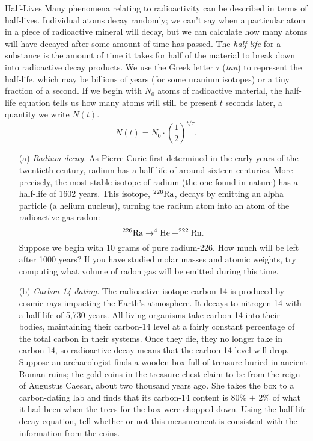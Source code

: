 \documentclass[12pt]{article}
\begin{document}
\begin{probdesc}{5}{Half-Lives}
Many phenomena relating to radioactivity can be described in terms of
half-lives.  Individual atoms decay randomly; we can't say when a
particular atom in a piece of radioactive mineral will decay, but we
can calculate how many atoms will have decayed after some amount of
time has passed.  The {\em half-life} for a substance is the amount of
time it takes for half of the material to break down into radioactive
decay products.  We use the Greek letter $\tau$ ({\em tau}) to
represent the half-life, which may be billions of years (for some
uranium isotopes) or a tiny fraction of a second.  If we begin with
$N_0$ atoms of radioactive material, the half-life equation tells us
how many atoms will still be present $t$ seconds later, a quantity we
write $N(t)$.
\begin{equation}
N(t) = N_0 \cdot \left(\frac{1}{2}\right)^{t / \tau}.
\end{equation}

\begin{enumerate}
\item[(a)] {\em Radium decay.}  As Pierre Curie first determined in
  the early years of the twentieth century, radium has a half-life of
  around sixteen centuries.  More precisely, the most stable isotope
  of radium (the one found in nature) has a half-life of 1602 years.
  This isotope, $^{226}{\rm Ra}$, decays by emitting an alpha particle (a
  helium nucleus), turning the radium atom into an atom of the
  radioactive gas radon:
  \begin{equation}
    ^{226}{\rm Ra} \rightarrow ^4{\rm He} + ^{222}{\rm Rn}.
  \end{equation}
  Suppose we begin with 10 grams of pure radium-226.  How much will be
  left after 1000 years?  If you have studied molar masses and atomic
  weights, try computing what volume of radon gas will be emitted
  during this time.

\item[(b)] {\em Carbon-14 dating.} The radioactive isotope carbon-14
  is produced by cosmic rays impacting the Earth's atmosphere.  It
  decays to nitrogen-14 with a half-life of 5,730 years.  All living
  organisms take carbon-14 into their bodies, maintaining their
  carbon-14 level at a fairly constant percentage of the total carbon
  in their systems.  Once they die, they no longer take in carbon-14,
  so radioactive decay means that the carbon-14 level will drop.
  Suppose an archaeologist finds a wooden box full of treasure buried
  in ancient Roman ruins; the gold coins in the treasure chest claim
  to be from the reign of Augustus Caesar, about two thousand years
  ago.  She takes the box to a carbon-dating lab and finds that its
  carbon-14 content is 80\% $\pm$ 2\% of what it had been when the
  trees for the box were chopped down.  Using the half-life decay
  equation, tell whether or not this measurement is consistent with
  the information from the coins.


\end{enumerate}
\end{probdesc}
\end{document}

